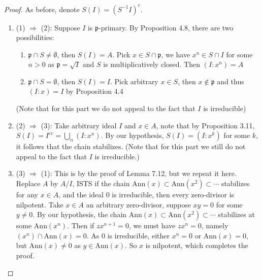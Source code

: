 \documentclass{solution}
\begin{document}
\begin{proof}
    As before, denote $S(I) = (S ^{-1} I)^c$.

    \begin{enumerate}
        \item (1) $\Rightarrow$ (2): Suppose $I$ is $\mathfrak{p}$-primary. By Proposition 4.8, there are two possibilities:
        \begin{enumerate}
            \item $\mathfrak{p} \cap S \ne \emptyset$, then $S(I) = A$. Pick $x \in S \cap \mathfrak{p}$, we have $x^n \in S \cap I$ for some $n \gt 0$ as $\mathfrak{p} = \sqrt{I}$ and $S$ is multiplicatively closed. Then $(I : x^n) = A$
            \item $\mathfrak{p} \cap S = \emptyset$, then $S(I) = I$. Pick arbitrary $x \in S$, then $x \notin \mathfrak{p}$ and thus $(I : x) = I$ by Proposition 4.4
        \end{enumerate}
        (Note that for this part we do not appeal to the fact that $I$ is irreducible)
        \item (2) $\Rightarrow$ (3): Take arbitrary ideal $I$ and $x \in A$, note that by Proposition 3.11, $S(I) = I^{ec} = \bigcup\limits_{n} (I : x^n)$. By our hypothesis, $S(I) = (I : x^k)$ for some $k$, it follows that the chain stabilizes. (Note that for this part we still do not appeal to the fact that $I$ is irreducible.)
        \item (3) $\Rightarrow$ (1): This is by the proof of Lemma 7.12, but we repeat it here. Replace $A$ by $A / I$, ISTS if the chain $\mathrm{Ann}(x) \subset \mathrm{Ann}(x^2) \subset \cdots$ stabilizes for any $x \in A$, and the ideal $0$ is irreducible, then every zero-divisor is nilpotent. Take $x \in A$ an arbitrary zero-divisor, suppose $xy = 0$ for some $y \ne 0$. By our hypothesis, the chain $\mathrm{Ann}(x) \subset \mathrm{Ann}(x^2) \subset \cdots$ stabilizes at some $\mathrm{Ann}(x^n)$. Then if $z x^{n + 1} = 0$, we must have $zx^n = 0$, namely $(x^n) \cap \mathrm{Ann}(x) = 0$. As $0$ is irreducible, either $x^n = 0$ or $\mathrm{Ann}(x) = 0$, but $\mathrm{Ann}(x) \ne 0$ as $y \in \mathrm{Ann}(x)$. So $x$ is nilpotent, which completes the proof.
    \end{enumerate}
\end{proof}
\end{document}
